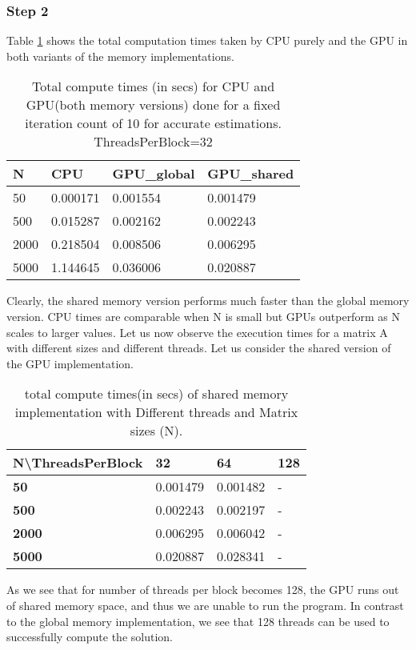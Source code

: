\subsubsection*{Step 2}
Table \ref{tab:perf} shows the total computation times taken by CPU purely and the GPU in both variants of the memory implementations. 
\begin{table}[h]
\centering
\begin{tabular}{@{}llll@{}}
  N    & CPU      & GPU\_global & GPU\_shared \\
  \hline
50   & 0.000171 & 0.001554    & 0.001479    \\
500  & 0.015287 & 0.002162    & 0.002243    \\
2000 & 0.218504 & 0.008506    & 0.006295    \\
5000 & 1.144645 & 0.036006    & 0.020887   
\end{tabular}
\caption{Total compute times (in secs) for CPU and GPU(both memory versions) done for a fixed iteration count of 10 for accurate estimations. ThreadsPerBlock=32}
\label{tab:perf}
\end{table}
Clearly, the shared memory version performs much faster than the global memory version. CPU times are comparable when N is small but GPUs outperform as N scales to larger values. 
Let us now observe the execution times for a matrix A with different sizes and different threads. Let us consider the shared version of the GPU implementation.
\begin{table}[]
\centering
\begin{tabular}{@{}llll@{}}
  \textbf{N\textbackslash{}ThreadsPerBlock} & \textbf{32} & \textbf{64} & \textbf{128} \\
  \hline
\textbf{50}                               & 0.001479    & 0.001482    & -            \\
\textbf{500}                              & 0.002243    & 0.002197    & -            \\
\textbf{2000}                             & 0.006295    & 0.006042    & -            \\
\textbf{5000}                             & 0.020887    & 0.028341    & -           
\end{tabular}
\caption{total compute times(in secs) of shared memory implementation with Different threads and Matrix sizes (N).}
\label{tab:shr}
\end{table}
As we see that for number of threads per block becomes 128, the GPU runs out of shared memory space, and thus we are unable to run the program. In contrast to the global memory implementation, we see that 128 threads can be used to successfully compute the solution.
